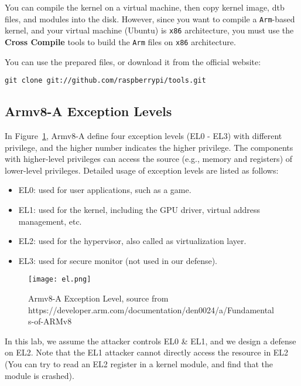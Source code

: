 You can compile the kernel on a virtual machine, then copy kernel image, dtb files, and modules into the disk.
However, since you want to compile a \texttt{Arm}-based kernel, and 
your virtual machine (Ubuntu) is \texttt{x86} architecture, you must 
use the \textbf{Cross Compile} tools to build the \texttt{Arm} files 
on \texttt{x86} architecture.

You can use the prepared files, or download it from the official 
website:

\begin{lstlisting}
git clone git://github.com/raspberrypi/tools.git
\end{lstlisting}




\subsection{Armv8-A Exception Levels}

In Figure~\ref{fig:armel}, Armv8-A define four exception levels (EL0 - EL3) with different privilege, and the higher number indicates the higher privilege.
The components with higher-level privileges can access the source (e.g., memory and registers) of lower-level privileges.
Detailed usage of exception levels are listed as follows:

\begin{itemize}
	\item EL0: used for user applications, such as a game.
	\item EL1: used for the kernel, including the GPU driver, virtual address management, etc.
	\item EL2: used for the hypervisor, also called as virtualization layer.
	\item EL3: used for secure monitor (not used in our defense).
\end{itemize}

\begin{figure}[htb]
	\centering
	\texttt{[image: el.png]}
	\caption{Armv8-A Exception Level, source from
		https://developer.arm.com/documentation/den0024/a/Fundamentals-of-ARMv8}
	\label{fig:armel}
\end{figure}

In this lab, we assume the attacker controls EL0 \& EL1, and we design a defense on EL2.
Note that the EL1 attacker cannot directly access the resource in EL2 
(You can try to read an EL2 register in a kernel module, and find 
that the module is crashed). 



